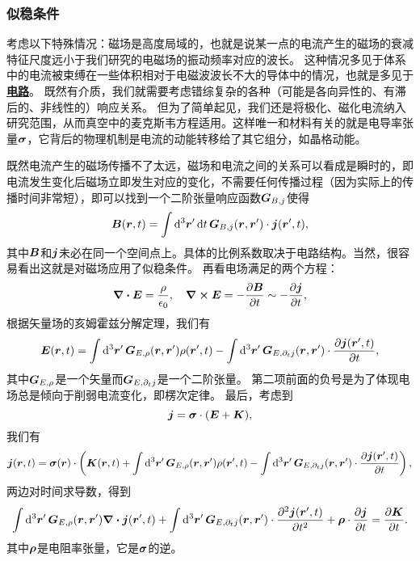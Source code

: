 \documentclass[UTF8, a4paper]{ctexart}
\newcommand*{\concept}[1]{\underline{\textbf{#1}}}
\begin{document}
\subsubsection{似稳条件}

考虑以下特殊情况：磁场是高度局域的，也就是说某一点的电流产生的磁场的衰减特征尺度远小于我们研究的电磁场的振动频率对应的波长。
这种情况多见于体系中的电流被束缚在一些体积相对于电磁波波长不大的导体中的情况，也就是多见于\concept{电路}。
既然有介质，我们就需要考虑错综复杂的各种（可能是各向异性的、有滞后的、非线性的）响应关系。
但为了简单起见，我们还是将极化、磁化电流纳入研究范围，从而真空中的麦克斯韦方程适用。这样唯一和材料有关的就是电导率张量$\vb*{\sigma}$，它背后的物理机制是电流的动能转移给了其它组分，如晶格动能。

既然电流产生的磁场传播不了太远，磁场和电流之间的关系可以看成是瞬时的，即电流发生变化后磁场立即发生对应的变化，不需要任何传播过程（因为实际上的传播时间非常短），即可以找到一个二阶张量响应函数$\vb*{G}_{B, j}$使得
\[
    \vb*{B}(\vb*{r}, t) = \int \dd[3]{\vb*{r}'} \dd{t} \vb*{G}_{B, j}(\vb*{r}, \vb*{r}') \cdot \vb*{j}(\vb*{r}', t),
\]
其中$\vb*{B}$和$\vb*{j}$未必在同一个空间点上。具体的比例系数取决于电路结构。当然，很容易看出这就是对磁场应用了似稳条件。
再看电场满足的两个方程：
\[
    \div{\vb*{E}} = \frac{\rho}{\epsilon_0}, \quad \curl{\vb*{E}} = - \pdv{\vb*{B}}{t} \sim - \pdv{\vb*{j}}{t},
\]
根据矢量场的亥姆霍兹分解定理，我们有
\[
    \vb*{E}(\vb*{r}, t) = \int \dd[3]{\vb*{r}'} \vb*{G}_{E, \rho}(\vb*{r}, \vb*{r}') \rho(\vb*{r}', t) - \int \dd[3]{\vb*{r}'} \vb*{G}_{E, \partial_t j}(\vb*{r}, \vb*{r}') \cdot \pdv{\vb*{j}(\vb*{r}', t)}{t} ,
\]
其中$\vb*{G}_{E, \rho}$是一个矢量而$\vb*{G}_{E, \partial_t j}$是一个二阶张量。
第二项前面的负号是为了体现电场总是倾向于削弱电流变化，即楞次定律。
最后，考虑到
\[
    \vb*{j} = \vb*{\sigma} \cdot (\vb*{E} + \vb*{K}),
\]
我们有
\[
    \vb*{j}(\vb*{r}, t) = \vb*{\sigma}(\vb*{r}) \cdot \left( \vb*{K}(\vb*{r}, t) + \int \dd[3]{\vb*{r}'} \vb*{G}_{E, \rho}(\vb*{r}, \vb*{r}') \rho(\vb*{r}', t) - \int \dd[3]{\vb*{r}'} \vb*{G}_{E, \partial_t j}(\vb*{r}, \vb*{r}') \cdot \pdv{\vb*{j}(\vb*{r}', t)}{t} \right),
\]
两边对时间求导数，得到
\begin{equation}
    \int \dd[3]{\vb*{r}'} \vb*{G}_{E, \rho}(\vb*{r}, \vb*{r}') \div{\vb*{j}}(\vb*{r}', t) + \int \dd[3]{\vb*{r}'} \vb*{G}_{E, \partial_t j}(\vb*{r}, \vb*{r}') \cdot \pdv[2]{\vb*{j}(\vb*{r}', t)}{t} + \vb*{\rho} \cdot \pdv{\vb*{j}}{t} = \pdv{\vb*{K}}{t}.
    \label{eq:circuit-eq}
\end{equation}
其中$\vb*{\rho}$是电阻率张量，它是$\vb*{\sigma}$的逆。
\end{document}
